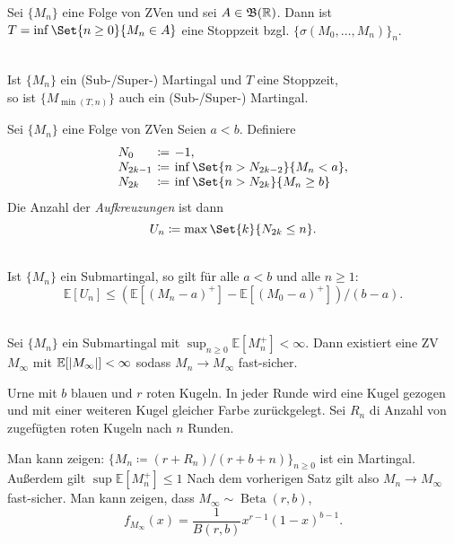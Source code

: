 \documentclass{cheat-sheet}
\newcommand{\E}{\mathbb{E}} %
\newcommand{\Bor}{\mathfrak{B}} %
\DeclareMathOperator{\Beta}{Beta} %
\begin{document}
\begin{bsp}
  Sei $\{ M_n \}$ eine Folge von ZVen und sei $A \in \Bor(\R)$.
  Dann ist $T = \inf \Set{n \geq 0}{M_n \in A}$ eine Stoppzeit bzgl. $\{ \sigma(M_0, \ldots, M_n) \}_n$.
\end{bsp}

\begin{satz} \mbox{} \\
  Ist $\{ M_n \}$ ein (Sub-/Super-) Martingal und $T$ eine Stoppzeit, \\
  so ist $\{ M_{\min(T, n)} \}$ auch ein (Sub-/Super-) Martingal.
\end{satz}



Sei $\{ M_n \}$ eine Folge von ZVen
Seien $a < b$.
Definiere
\[
  \arraycolsep=2pt
  \begin{array}{l c l}
    N_0 &\coloneqq& -1, \\
    N_{2k-1} &\coloneqq& \inf \Set{n > N_{2k-2}}{M_n < a}, \\
    N_{2k} &\coloneqq& \inf \Set{n > N_{2k}}{M_n \geq b}
  \end{array}
\]
Die Anzahl der \textit{Aufkreuzungen} ist dann
\[
  U_n \coloneqq \max \Set{k}{N_{2k} \leq n}.
\]

\begin{satz} \mbox{}\\
  Ist $\{ M_n \}$ ein Submartingal, so gilt für alle $a < b$ und alle $n \geq 1$:
  \[ \E[ U_n ] \leq (\E[ (M_n - a)^{+} ] - \E[ (M_0 - a)^{+} ]) / (b - a). \]
\end{satz}

\begin{satz} \mbox{}\\
  Sei $\{ M_n \}$ ein Submartingal mit ${\sup}_{n \geq 0} \E [ M_n^{+} ] < \infty$.
  Dann existiert eine ZV $M_\infty$ mit $\E[ \abs{M_\infty} ] < \infty$ sodass $M_n \to M_\infty$ fast-sicher.
\end{satz}

\begin{bsp}
  Urne mit $b$ blauen und $r$ roten Kugeln.
  In jeder Runde wird eine Kugel gezogen und mit einer weiteren Kugel gleicher Farbe zurückgelegt.
  Sei $R_n$ di Anzahl von zugefügten roten Kugeln nach $n$ Runden.

  Man kann zeigen: $\{ M_n \coloneqq (r + R_n) / (r + b + n) \}_{n \geq 0}$ ist ein Martingal.
  Außerdem gilt $\sup \E[M_n^{+}] \leq 1$
  Nach dem vorherigen Satz gilt also $M_n \to M_\infty$ fast-sicher.
  Man kann zeigen, dass $M_\infty \sim \Beta(r, b)$,
  \[
    f_{M_\infty}(x) = \frac{1}{B(r, b)} x^{r-1} (1-x)^{b-1}.
  \]
\end{bsp}
\end{document}
